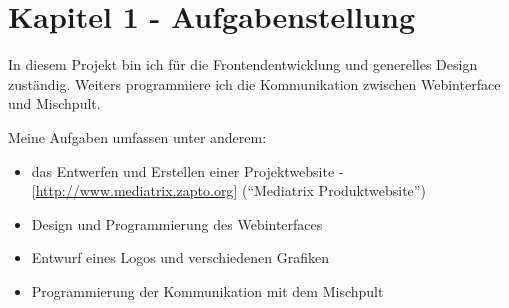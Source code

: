\hypertarget{kapitel-1---aufgabenstellung}{%
\section{Kapitel 1 -
Aufgabenstellung}\label{kapitel-1---aufgabenstellung}}

In diesem Projekt bin ich für die Frontendentwicklung und generelles
Design zuständig. Weiters programmiere ich die Kommunikation zwischen
Webinterface und Mischpult.

Meine Aufgaben umfassen unter anderem:

\begin{itemize}
\tightlist
\item
  das Entwerfen und Erstellen einer Projektwebsite -
  {[}\url{http://www.mediatrix.zapto.org}{]} (``Mediatrix
  Produktwebsite'')
\item
  Design und Programmierung des Webinterfaces
\item
  Entwurf eines Logos und verschiedenen Grafiken
\item
  Programmierung der Kommunikation mit dem Mischpult
\end{itemize}
